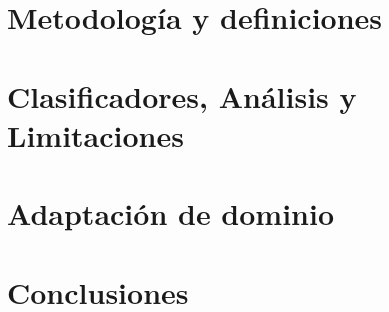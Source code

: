\documentclass[11pt,a4paper,twoside]{tesis}
\begin{document}
\chapter{Metodología y definiciones}

%
\chapter{Clasificadores, Análisis y Limitaciones}

%
\chapter{Adaptación de dominio}

%
\chapter{Conclusiones}
%

%
\appendix
%





\backmatter

\end{document}
